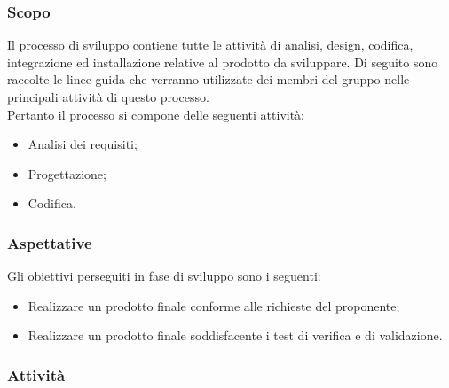 \subsubsection{Scopo}
Il processo di sviluppo contiene tutte le attività di analisi, design, codifica, integrazione ed installazione relative al prodotto da sviluppare. Di seguito sono raccolte le linee guida che verranno utilizzate dei membri del gruppo nelle principali attività di questo processo. \\
Pertanto il processo si compone delle seguenti attività:
    \begin{itemize}
        \item Analisi dei requisiti;
        \item Progettazione;
        \item Codifica.
    \end{itemize}


\subsubsection{Aspettative}
Gli obiettivi perseguiti in fase di sviluppo sono i seguenti:
    \begin{itemize}
        \item Realizzare un prodotto finale conforme alle richieste del proponente;
        \item Realizzare un prodotto finale soddisfacente i test di verifica e di validazione.
        
    \end{itemize}



\subsubsection{Attività}
